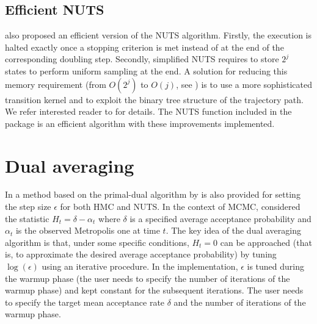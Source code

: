 \documentclass{article}
\begin{document}
\subsection{Efficient NUTS}
\par \citet{hoffman2011no} also proposed an efficient version of the NUTS algorithm. Firstly, the execution is halted exactly once a stopping criterion is met instead of at the end of the corresponding doubling step. Secondly, simplified NUTS requires to store $2^j$ states to perform uniform sampling at the end. A solution for reducing this memory requirement (from $O(2^j)$ to $O(j)$, see \citealp{hoffman2011no}) is to use a more sophisticated transition kernel and to exploit the binary tree structure of the trajectory path. We refer interested reader to \citet{hoffman2011no} for details. The NUTS function included in the package is an efficient algorithm with these improvements implemented.


\section{Dual averaging}

In \citet{hoffman2011no} a method based on the primal-dual algorithm by \citet{nesterov2009dual} is also provided for setting the step size $\epsilon$ for both HMC and NUTS.
In the context of MCMC, considered the statistic $H_t=\delta-\alpha_t$ where $\delta$ is a specified average acceptance probability and $\alpha_t$ is the observed Metropolis one at time $t$. %
The key idea of the dual averaging algorithm is that, under some specific conditions, $H_t=0$ can be approached (that is, to approximate the desired average acceptance probability) by tuning $\log(\epsilon)$ using an iterative procedure. In the implementation, $\epsilon$ is tuned during the warmup phase (the user needs to specify the number of iterations of the warmup phase) and kept constant for the subsequent iterations. The user needs to specify the target mean acceptance rate $\delta$ and the number of iterations of the warmup phase.
\end{document}
